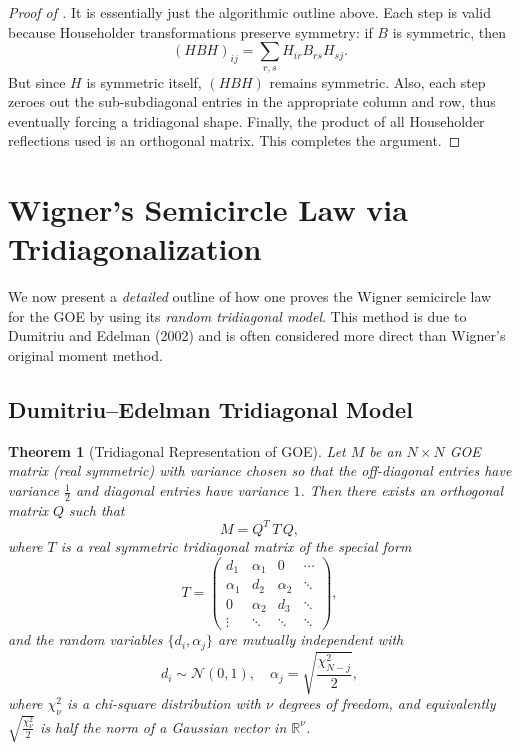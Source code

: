 \documentclass[letterpaper,11pt,oneside,reqno]{article}
\numberwithin{equation}{section}
\newtheorem{theorem}[proposition]{Theorem}
\theoremstyle{definition}
\begin{document}
\begin{proof}[Proof of ]
It is essentially just the algorithmic outline above.  Each step is valid because Householder transformations preserve symmetry: if \(B\) is symmetric, then
\[
  (H B H)_{ij}
  = \sum_{r,s} H_{ir} B_{rs} H_{sj}.
\]
But since \(H\) is symmetric itself, \((H B H)\) remains symmetric.  Also, each step zeroes out the sub-subdiagonal entries in the appropriate column and row, thus eventually forcing a tridiagonal shape.  Finally, the product of all Householder reflections used is an orthogonal matrix. This completes the argument.
\end{proof}

\section{Wigner’s Semicircle Law via Tridiagonalization}
\label{sec:Wigner-SC-detailed}

We now present a \emph{detailed} outline of how one proves the Wigner semicircle law for the GOE by using its \emph{random tridiagonal model}. This method is due to Dumitriu and Edelman (2002) and is often considered more direct than Wigner’s original moment method.

\subsection{Dumitriu–Edelman Tridiagonal Model}

\begin{theorem}[Tridiagonal Representation of GOE]
\label{thm:DE-model}
Let \(M\) be an \(N\times N\) GOE matrix (real symmetric) with variance chosen so that the off-diagonal entries have variance \(\tfrac12\) and diagonal entries have variance \(1\).  Then there exists an orthogonal matrix \(Q\) such that
\[
   M = Q^T\,T\,Q,
\]
where \(T\) is a real symmetric tridiagonal matrix of the special form
\[
   T = \begin{pmatrix}
         d_1 & \alpha_1 & 0 & \cdots \\
         \alpha_1 & d_2 & \alpha_2 & \ddots \\
         0 & \alpha_2 & d_3 & \ddots \\
         \vdots & \ddots & \ddots & \ddots
       \end{pmatrix},
\]
and the random variables \(\{d_i,\alpha_j\}\) are mutually independent with
\[
  d_i \sim \mathcal{N}(0,1),
  \quad
  \alpha_j = \sqrt{\frac{\chi^2_{N-j}}{2}},
\]
where \(\chi^2_{\nu}\) is a chi-square distribution with \(\nu\) degrees of freedom, and equivalently \(\sqrt{\tfrac{\chi^2_\nu}{2}}\) is half the norm of a Gaussian vector in \(\mathbb{R}^\nu\).
\end{theorem}
\end{document}
